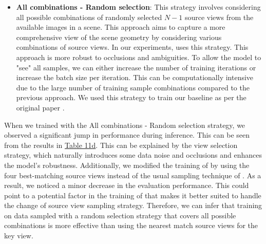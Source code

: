 \begin{enumerate}
\begin{itemize}
    \item \textbf{All combinations - Random selection}: This strategy involves considering all possible combinations of randomly selected $N - 1$ source views from the available images in a scene. This approach aims to capture a more comprehensive view of the scene geometry by considering various combinations of source views. In our experiments, {\brs} uses this strategy. This approach is more robust to occlusions and ambiguities. To allow the model to "see" all samples, we can either increase the number of training iterations or increase the batch size per iteration. This can be computationally intensive due to the large number of training sample combinations compared to the previous approach.  We used this strategy to train our {\rmvd} baseline as per the original paper \cite{schroeppel2022benchmark}. 
\end{itemize}
When we trained {\mvsn} with the All combinations - Random selection strategy, we observed a significant jump in performance during inference. This can be seen from the results in \hyperref[tab:data-prop]{Table 11d}. This can be explained by the view selection strategy, which naturally introduces some data noise and occlusions and enhances the model's robustness. Additionally, we modified the training of {\rmvd} by using the four best-matching source views instead of the usual sampling technique of {\brs}. As a result, we noticed a minor decrease in the evaluation performance. This could point to a potential factor in the training of {\rmvd} that makes it better suited to handle the change of source view sampling strategy. Therefore, we can infer that training on data sampled with a random selection strategy that covers all possible combinations is more effective than using the nearest match source views for the key view.  
 
\end{enumerate}
